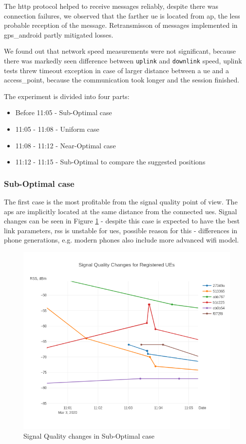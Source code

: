 The \gls{http} protocol helped to receive messages reliably, despite there was connection failures, we observed that the farther \gls{ue} is located from \gls{ap}, the less probable reception of the message. Retransmisson of messages implemented in \gls{gps_android} partly mitigated losses.

We found out that network speed measurements were not significant, because there was markedly seen difference between \texttt{uplink} and \texttt{downlink} speed, uplink tests threw timeout exception in case of larger distance between a \gls{ue} and a \gls{access_point}, because the communication took longer and the session finished.

The experiment is divided into four parts:

\begin{itemize}
\tightlist
\item
  Before 11:05 - Sub-Optimal case
\item
  11:05 - 11:08 - Uniform case
\item
  11:08 - 11:12 - Near-Optimal case
\item
  11:12 - 11:15 - Sub-Optimal to compare the suggested positions
\end{itemize}

\subsubsection{Sub-Optimal case}

The first case is the most profitable from the signal quality point of
view. The \glspl{ap} are implicitly located at the same distance from the
connected \glspl{ue}. Signal changes can be seen in Figure \ref{fig:signal-quality-changes-sub-optimal} - despite this case is expected to have the best link parameters, \acrshort{rss} is unstable for \glspl{ue}, possible reason for this - differences in phone generations, e.g. modern phones also include more advanced \gls{wifi} model.

\begin{figure}[H]
	\centering
	\includegraphics[width=0.7\linewidth,keepaspectratio]{images/Exp4_Suboptimal.png}
\caption{Signal Quality changes in Sub-Optimal case}
\label{fig:signal-quality-changes-sub-optimal}
\end{figure}

